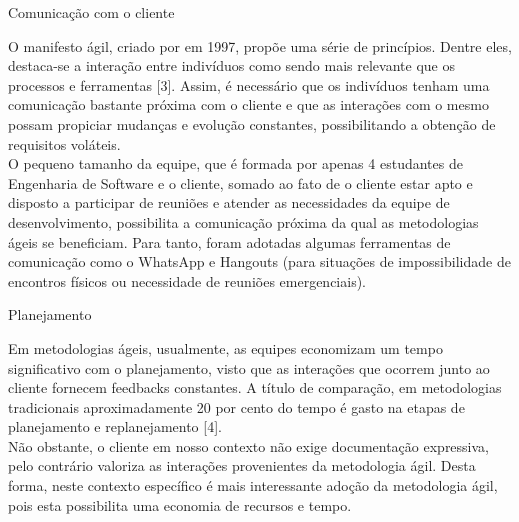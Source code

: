 {
	\large{Comunicação com o cliente\\}

	\tab O manifesto ágil, criado por  em 1997, propõe uma série de princípios. Dentre eles, destaca-se a interação entre indivíduos como sendo mais relevante que os processos e ferramentas  [3]. Assim,  é necessário que os indivíduos tenham uma comunicação bastante próxima  com o cliente e que as interações com o mesmo possam propiciar mudanças e evolução constantes, possibilitando  a obtenção de requisitos voláteis. \\
	\tab O pequeno tamanho da equipe, que é formada por apenas 4 estudantes de Engenharia de Software e o cliente, somado ao fato de o cliente estar apto e disposto a participar de reuniões e atender as necessidades da equipe de desenvolvimento, possibilita a comunicação próxima da qual as metodologias ágeis se beneficiam. Para tanto, foram adotadas algumas ferramentas de comunicação como o WhatsApp e Hangouts (para situações de impossibilidade de encontros físicos ou necessidade de reuniões emergenciais). \\

}
	
{
	\large{Planejamento\\}

	\tab Em metodologias ágeis, usualmente, as equipes economizam um tempo significativo com o planejamento, visto que as interações que ocorrem junto ao cliente fornecem feedbacks constantes. A título de comparação, em metodologias tradicionais aproximadamente 20 por cento do tempo é gasto na etapas de planejamento e replanejamento [4]. \\
	\tab Não obstante, o cliente em nosso contexto não exige documentação expressiva, pelo contrário valoriza as interações provenientes da metodologia ágil. Desta forma, neste contexto  específico é mais interessante adoção da metodologia ágil,  pois esta  possibilita uma economia de recursos e tempo. \\

}

